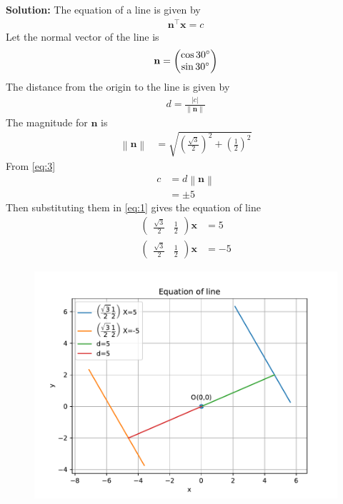 \documentclass[12pt]{article}
\providecommand{\brak}[1]{\ensuremath{\left(#1\right)}}
\providecommand{\norm}[1]{\left\lVert#1\right\rVert}
\newcommand{\solution}{\noindent \textbf{Solution: }}
\newcommand{\myvec}[1]{\ensuremath{\begin{pmatrix}#1\end{pmatrix}}}
\providecommand{\abs}[1]{\left\vert#1\right\vert}
\let\vec\mathbf
\begin{document}
\begin{enumerate}
\solution The equation of a line is given by
		\begin{align}                                                                                          \vec{n}^\top\vec{x}=c \label{eq:1}                                                                                  \end{align}
Let the normal vector of the line is
\begin{align}
	\vec{n}=\myvec{\cos{30}\degree\\\sin{30}\degree}
\end{align}
The distance from the origin to the line is given by
\begin{align}
	d=\frac{\abs{c}}{\norm{\vec{n}}}\label{eq:3}
\end{align}
		The magnitude for $\vec{n}$ is 
	\begin{align}
		\norm{\vec{n}} &=\sqrt{\brak{{\frac{\sqrt{3}}{2}}}^2 + \brak{{\frac{1}{2}}}^2}
	\end{align}
		From \eqref{eq:3}
\begin{align}
	c&=d\norm{\vec{n}}\\
	&=\pm5
\end{align}
		Then substituting them in \eqref{eq:1} gives the equation of line
\begin{align}
	\myvec{\frac{\sqrt{3}}{2}& \frac{1}{2}}\vec{x}&=5\\
	\myvec{\frac{\sqrt{3}}{2}& \frac{1}{2}}\vec{x}&=-5
\end{align}
\begin{figure}[!h]
\begin{center}
\includegraphics[width=\columnwidth]{figs/fig.pdf}
\end{center}
\caption{}
\label{fig:Fig1}
\end{figure}
\end{enumerate}
\end{document}
